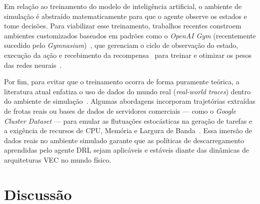 Em relação ao treinamento do modelo de inteligência artificial, o ambiente de simulação é abstraído matematicamente para que o agente observe os estados e tome decisões. Para viabilizar esse treinamento, trabalhos recentes constroem ambientes customizados baseados em padrões como o \textit{OpenAI Gym} (recentemente sucedido pelo \textit{Gymnasium})~\cite{brockman2016openai}, que gerenciam o ciclo de observação do estado, execução da ação e recebimento da recompensa~\cite{uddin2025} para treinar e otimizar os pesos das redes neurais~\cite{moghaddasi2024, kumar2023, wu2025}.

Por fim, para evitar que o treinamento ocorra de forma puramente teórica, a literatura atual enfatiza o uso de dados do mundo real (\textit{real-world traces}) dentro do ambiente de simulação~\cite{farimani2024}. Algumas abordagens incorporam trajetórias extraídas de frotas reais ou bases de dados de servidores comerciais --- como o \textit{Google Cluster Dataset} --- para emular as flutuações estocásticas na geração de tarefas e a exigência de recursos de \gls{CPU}, Memória e Largura de Banda~\cite{long2025}. Essa imersão de dados reais no ambiente simulado garante que as políticas de descarregamento aprendidas pelo agente \gls{DRL} sejam aplicáveis e estáveis diante das dinâmicas de arquiteturas \gls{VEC} no mundo físico.

\section*{Discussão}

